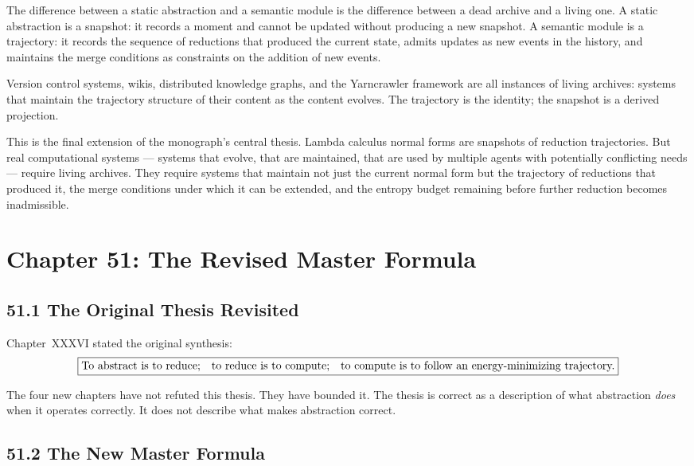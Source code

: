 \documentclass[12pt,letterpaper]{article}
\theoremstyle{remark}
\begin{document}
The difference between a static abstraction and a semantic module
is the difference between a dead archive and a living one. A
static abstraction is a snapshot: it records a moment and cannot
be updated without producing a new snapshot. A semantic module is
a trajectory: it records the sequence of reductions that produced
the current state, admits updates as new events in the history, and
maintains the merge conditions as constraints on the addition of
new events.

Version control systems, wikis, distributed knowledge graphs, and
the Yarncrawler framework are all instances of living archives:
systems that maintain the trajectory structure of their content as
the content evolves. The trajectory is the identity; the snapshot
is a derived projection.

This is the final extension of the monograph's central thesis.
Lambda calculus normal forms are snapshots of reduction
trajectories. But real computational systems — systems that evolve,
that are maintained, that are used by multiple agents with
potentially conflicting needs — require living archives. They
require systems that maintain not just the current normal form but
the trajectory of reductions that produced it, the merge conditions
under which it can be extended, and the entropy budget remaining
before further reduction becomes inadmissible.

\newpage
\section{Chapter 51: The Revised Master Formula}

\subsection{51.1 The Original Thesis Revisited}

Chapter~XXXVI stated the original synthesis:
\[
\boxed{
\text{To abstract is to reduce;\quad
to reduce is to compute;\quad
to compute is to follow an energy-minimizing trajectory.}
}
\]

The four new chapters have not refuted this thesis. They have
bounded it. The thesis is correct as a description of what
abstraction \emph{does} when it operates correctly. It does not
describe what makes abstraction correct.

\subsection{51.2 The New Master Formula}
\end{document}
